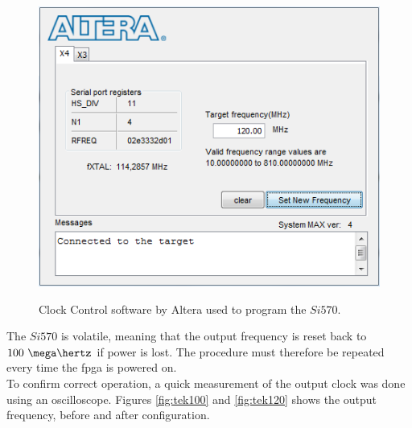 \documentclass[main.tex]{subfiles}
\begin{document}
\begin{figure}[ht] %
\begin{center}
\includegraphics[scale=1]{../img/clk_cont120}  \\[0.1 cm]
\caption{Clock Control software by Altera used to program the $Si570$.}
\label{fig:clk_cont120}
\end{center}
\end{figure} 

The $Si570$ is volatile, meaning that the output frequency is reset back to $100~\mega\hertz$ if power is lost. The procedure must therefore be repeated every time the \gls{fpga} is powered on.\\
To confirm correct operation, a quick measurement of the output clock was done using an oscilloscope. Figures \ref{fig:tek100} and \ref{fig:tek120} shows the output frequency, before and after configuration.\\
\end{document}
